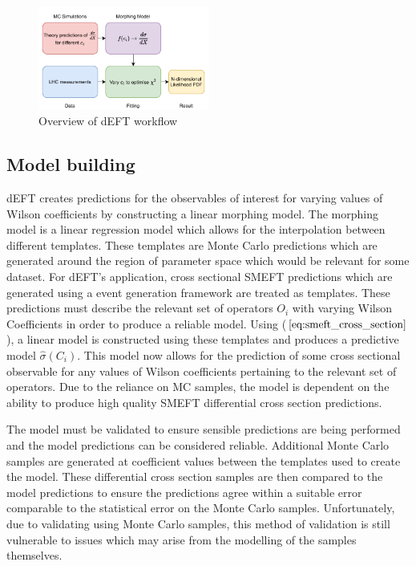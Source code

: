 \documentclass[a4paper,11pt]{article}
\begin{document}
\begin{figure}[htb]
    \centering
    \includegraphics[width=0.5\textwidth]{images/deft-workflow.pdf}
    \caption{Overview of dEFT workflow}
\end{figure}

\subsection{Model building}
dEFT creates predictions for the observables of interest for varying values of Wilson coefficients by constructing a linear morphing model.
The morphing model is a linear regression model which allows for the interpolation between different templates.
These templates are Monte Carlo predictions which are generated around the region of parameter space which would be relevant for some dataset.
For dEFT's application, cross sectional SMEFT predictions which are generated using a event generation framework are treated as templates.
These predictions must describe the relevant set of operators $O_{i}$ with varying Wilson Coefficients in order to produce a reliable model.
Using ($\ref{eq:smeft_cross_section}$), a linear model is constructed using these templates and produces a predictive model $\hat{\sigma}({C_i})$.
This model now allows for the prediction of some cross sectional observable for any values of Wilson coefficients pertaining to the relevant set of operators.
Due to the reliance on MC samples, the model is dependent on the ability to produce high quality SMEFT differential cross section predictions.

The model must be validated to ensure sensible predictions are being performed and the model predictions can be considered reliable.
Additional Monte Carlo samples are generated at coefficient values between the templates used to create the model.
These differential cross section samples are then compared to the model predictions to ensure the predictions agree within a suitable error comparable to the statistical error on the Monte Carlo samples.
Unfortunately, due to validating using Monte Carlo samples, this method of validation is still vulnerable to issues which may arise from the modelling of the samples themselves.
\end{document}
